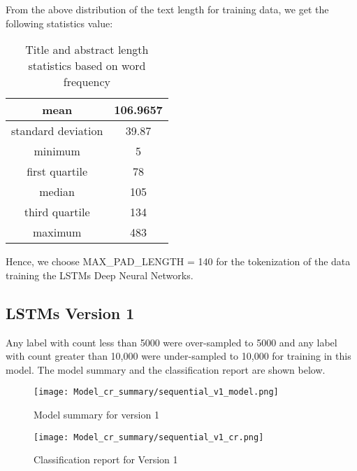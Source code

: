 From the above distribution of the text length for training data, we get the following statistics value:
\begin{table}[H]
    \begin{center}
        \begin{tabular}{ |c|c| }
            \hline
            mean               & 106.9657 \\
            \hline
            standard deviation & 39.87 \\
            \hline
            minimum            & 5       \\
            \hline
            first quartile     & 78      \\
            \hline
            median             & 105      \\
            \hline
            third quartile     & 134      \\
            \hline
            maximum            & 483     \\
            \hline
        \end{tabular}
    \end{center}
    \caption{Title and abstract length statistics based on word frequency}
    \label{table:Title and abstract length statistics based on word frequency}
\end{table}

Hence, we choose MAX\_PAD\_LENGTH = 140 for the tokenization of the data training the LSTMs Deep Neural Networks.

\subsection{LSTMs Version 1}
Any label with count less than 5000 were over-sampled to 5000 and any label with count greater than 10,000 were under-sampled to 10,000 for training in this model. The model summary and the classification report are shown below.

\begin{figure}[H]
    \centering
    \texttt{[image: Model\_cr\_summary/sequential\_v1\_model.png]}
    \caption{Model summary for version 1}
    \label{fig:Model summary for version 1}
\end{figure}

\begin{figure}[H]
    \centering
    \texttt{[image: Model\_cr\_summary/sequential\_v1\_cr.png]}
    \caption{Classification report for Version 1}
    \label{fig: Classification report for Version 1}
\end{figure}

